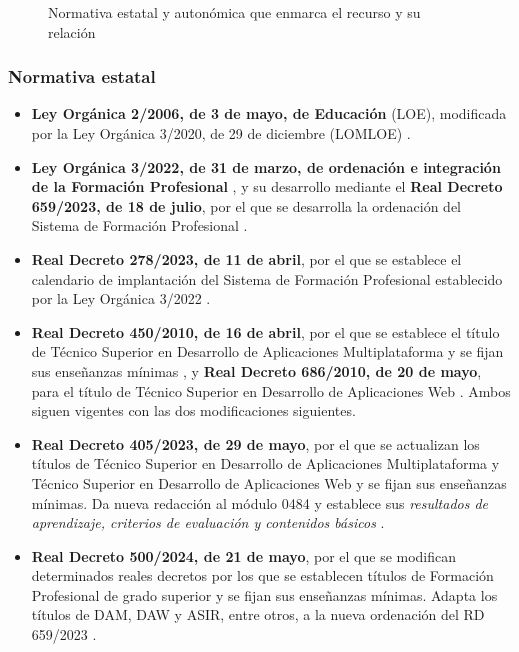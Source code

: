 \documentclass[11pt,a4paper]{article}
\begin{document}
\begin{figure}[H]
\caption{Normativa estatal y autonómica que enmarca el recurso y su relación}
\label{fig:normativa}
\end{figure}

\subsubsection{Normativa estatal}

\begin{itemize}
  \item \textbf{Ley Orgánica 2/2006, de 3 de mayo, de Educación} (LOE), modificada por la
        Ley Orgánica 3/2020, de 29 de diciembre (LOMLOE) \cite{loe,lomloe}.
  \item \textbf{Ley Orgánica 3/2022, de 31 de marzo, de ordenación e integración de la
        Formación Profesional} \cite{lofp}, y su desarrollo mediante el
        \textbf{Real Decreto 659/2023, de 18 de julio}, por el que se desarrolla la
        ordenación del Sistema de Formación Profesional \cite{rd659}.
  \item \textbf{Real Decreto 278/2023, de 11 de abril}, por el que se establece el calendario
        de implantación del Sistema de Formación Profesional establecido por la Ley Orgánica
        3/2022 \cite{rd278}.
  \item \textbf{Real Decreto 450/2010, de 16 de abril}, por el que se establece el título
        de Técnico Superior en Desarrollo de Aplicaciones Multiplataforma y se fijan sus
        enseñanzas mínimas \cite{rd450}, y \textbf{Real Decreto 686/2010, de 20 de
        mayo}, para el título de Técnico Superior en Desarrollo de Aplicaciones Web
        \cite{rd686}. Ambos siguen vigentes con las dos modificaciones siguientes.
  \item \textbf{Real Decreto 405/2023, de 29 de mayo}, por el que se actualizan los títulos
        de Técnico Superior en Desarrollo de Aplicaciones Multiplataforma y Técnico Superior
        en Desarrollo de Aplicaciones Web y se fijan sus enseñanzas mínimas. Da nueva
        redacción al módulo 0484 y establece sus \emph{resultados de aprendizaje, criterios
        de evaluación y contenidos básicos} \cite{rd405}.
  \item \textbf{Real Decreto 500/2024, de 21 de mayo}, por el que se modifican determinados
        reales decretos por los que se establecen títulos de Formación Profesional de grado
        superior y se fijan sus enseñanzas mínimas. Adapta los títulos de DAM, DAW y ASIR,
        entre otros, a la nueva ordenación del RD 659/2023 \cite{rd500}.
\end{itemize}
\end{document}
